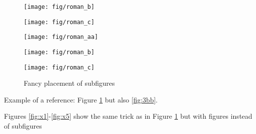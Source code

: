 \documentclass[12pt,a4paper]{article}
\begin{document}
\begin{figure}[!t]\centering
\setcounter{subfigure}{0}
\addtocounter{figure}{1}
\def\hgt{15cm}
\def\wdt{5cm}
 \begin{minipage}[b][\hgt][s]{0.45\linewidth}
  \begin{center}
   \texttt{[image: fig/roman\_b]}
   \label{fig:3a}
  \end{center}

  \vfill

  \begin{center}
   \texttt{[image: fig/roman\_c]}
   \label{fig:3bb}
  \end{center}

   \vfill

  \begin{center}
   \texttt{[image: fig/roman\_aa]}
   \label{fig:3c}
  \end{center}
 \end{minipage}
%
 \quad
%
 \begin{minipage}[b][\hgt][s]{0.45\linewidth}
  \begin{center}
   \texttt{[image: fig/roman\_b]}
   \label{fig:3d}
  \end{center}

  \vfill

  \begin{center}
   \texttt{[image: fig/roman\_c]}
   \label{fig:3e}
  \end{center}
 \end{minipage}
 \addtocounter{figure}{-1}
 \caption{Fancy placement of subfigures}\label{fig:3}
\end{figure}

Example of a reference: Figure \ref{fig:3} but also \ref{fig:3bb}.

\clearpage %

Figures \ref{fig:x1}-\ref{fig:x5} show the same trick as 
in Figure \ref{fig:3} but with figures instead of 
subfigures
\end{document}
